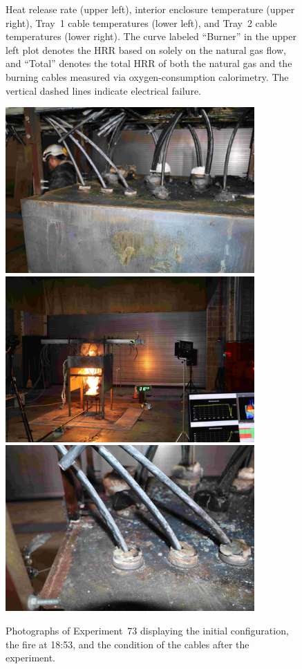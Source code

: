\begin{figure}[H]
\caption[HRR and temperatures of Experiment 73]{Heat release rate (upper left), interior enclosure temperature (upper right), Tray~1 cable temperatures (lower left), and Tray~2 cable temperatures (lower right). The curve labeled ``Burner'' in the upper left plot denotes the HRR based on solely on the natural gas flow, and ``Total'' denotes the total HRR of both the natural gas and the burning cables measured via oxygen-consumption calorimetry. The vertical dashed lines indicate electrical failure.}
\label{fig:Test_73}
\end{figure}

\begin{figure}[p]
\centering
\includegraphics[height=2.50in]{../FIGURES/Test_73_Photo_1} \\ \vspace{0.1in}
\includegraphics[height=2.50in]{../FIGURES/Test_73_Photo_2} \\ \vspace{0.1in}
\includegraphics[height=2.50in]{../FIGURES/Test_73_Photo_3}
\caption[Photographs of Experiment~73]{Photographs of Experiment~73 displaying the initial configuration, the fire at 18:53, and the condition of the cables after the experiment.}
\label{fig:Test_73_photos}
\end{figure}



